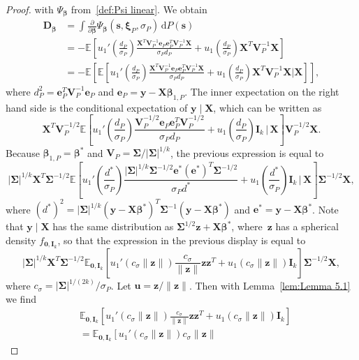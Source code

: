 \documentclass{article}
\numberwithin{equation}{section}
\theoremstyle{plain}
\newcommand{\dd}{\mathrm{d}}
\newcommand{\bbeta}{\bm\beta}
\newcommand{\bxi}{\bm\xi}
\newcommand{\bSigma}{\mathbf{\Sigma}}
\newcommand{\by}{\mathbf{y}}
\newcommand{\bs}{\mathbf{s}}
\newcommand{\bu}{\mathbf{u}}
\newcommand{\bz}{\mathbf{z}}
\newcommand{\be}{\mathbf{e}}
\newcommand{\bX}{\mathbf{X}}
\newcommand{\bV}{\mathbf{V}}
\newcommand{\bI}{\mathbf{I}}
\newcommand{\bD}{\mathbf{D}}
\newcommand{\E}{\mathbb{E}}
\begin{document}
\begin{proof}
with $\Psi_{\bbeta}$ from~\eqref{def:Psi linear}.
We obtain
\begin{equation}
\label{eq:Dbeta elliptical}
\begin{split}
\bD_{\bbeta}
&=
\int
\frac{\partial}{\partial \bbeta}
\Psi_{\bbeta}(\bs,\bxi_P,\sigma_P)\,\dd P(\bs)\\
&=
-\E
\left[
u_1'\left(\frac{d_P}{\sigma_P}\right)
\frac{\bX^T\bV_P^{-1}\be_P
\be_P^T
\bV_P^{-1}\bX}{\sigma_P d_P}
+
u_1\left(\frac{d_P}{\sigma_P}\right)\bX^T\bV_P^{-1}\bX
\right]\\
&=
-\E
\left[
\E
\left[
u_1'\left(\frac{d_P}{\sigma_P}\right)
\frac{\bX^T\bV_P^{-1}\be_P
\be_P^T
\bV_P^{-1}\bX}{\sigma_P d_P}
+
u_1\left(\frac{d_P}{\sigma_P}\right)\bX^T\bV_P^{-1}\bX
\bigg|
\bX
\right]
\right],
\end{split}
\end{equation}
where $d_P^2=\be_P^T\bV_P^{-1}\be_P$ and $\be_P=\by-\bX\bbeta_{1,P}$.
The inner expectation on the right hand side is the conditional expectation of $\by\mid\bX$,
which can be written as
\[
\bX^T\bV_P^{-1/2}
\E
\left[
u_1'\left(\frac{d_P}{\sigma_P}\right)
\frac{\bV_P^{-1/2}\be_P
\be_P^T
\bV_P^{-1/2}}{\sigma_P d_P}
+
u_1\left(\frac{d_P}{\sigma_P}\right)\bI_k
\,\Bigg|\,
\bX
\right]
\bV_P^{-1/2}\bX.
\]
Because $\bbeta_{1,P}=\bbeta^*$ and $\bV_P=\bSigma/|\bSigma|^{1/k}$, the previous expression is equal to
\[
|\bSigma|^{1/k}
\bX^T\bSigma^{-1/2}
\E
\left[
u_1'\left(\frac{d^*}{\sigma_P}\right)
\frac{|\bSigma|^{1/k}\bSigma^{-1/2}\be^*(\be^*)^T\bSigma^{-1/2}}{\sigma_Pd^*}
+
u_1\left(\frac{d^*}{\sigma_P}\right)\bI_k
\,\Bigg|\,
\bX
\right]
\bSigma^{-1/2}\bX,
\]
where $(d^*)^2=|\bSigma|^{1/k}(\by-\bX\bbeta^*)^T\bSigma^{-1}(\by-\bX\bbeta^*)$ and $\be^*=\by-\bX\bbeta^*$.
Note that $\by\mid\bX$ has the same distribution as $\bSigma^{1/2}\bz+\bX\bbeta^*$,
where~$\bz$ has a spherical density $f_{\mathbf{0},\bI_k}$,
so that the expression in the previous display is equal to
\[
|\bSigma|^{1/k}
\bX^T
\bSigma^{-1/2}
\mathbb{E}_{\mathbf{0},\bI_k}
\left[
u_1'\left(c_\sigma\|\bz\|\right)
\frac{c_\sigma}{\|\bz\|}
\bz\bz^T
+
u_1\left(c_\sigma\|\bz\|\right)
\bI_k
\right]
\bSigma^{-1/2}
\bX,
\]
where $c_\sigma=|\bSigma|^{1/(2k)}/\sigma_P$.
Let $\bu=\bz/\|\bz\|$.
Then with Lemma~\ref{lem:Lemma 5.1} we find
\[
\begin{split}
&
\mathbb{E}_{\mathbf{0},\bI_k}
\left[
u_1'\left(c_\sigma\|\bz\|\right)
\frac{c_\sigma}{\|\bz\|}
\bz\bz^T
+
u_1\left(c_\sigma\|\bz\|\right)
\bI_k
\right]\\
&=
\mathbb{E}_{\mathbf{0},\bI_k}
\left[
u_1'\left(c_\sigma\|\bz\|\right)c_\sigma\|\bz\|

\end{split}\]
\end{proof}
\end{document}
